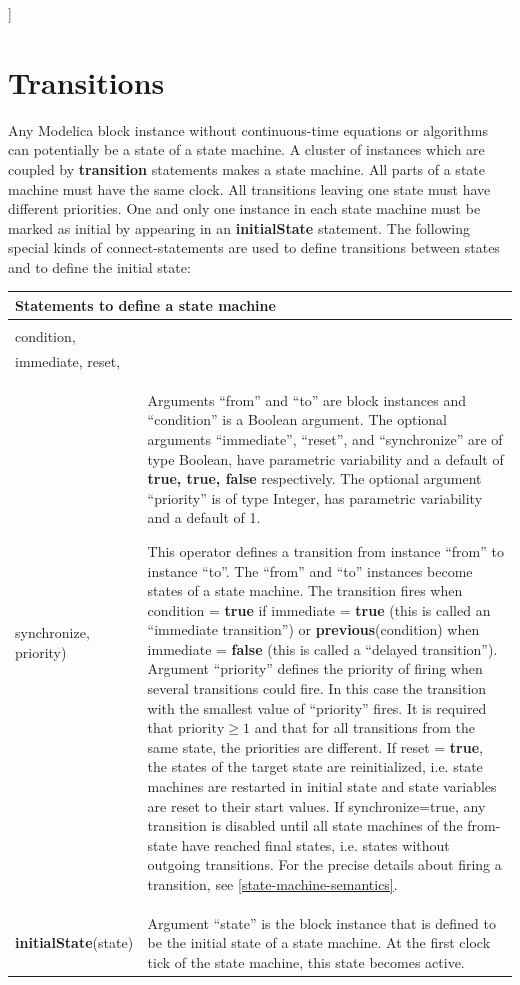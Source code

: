 \documentclass[10pt,a4paper]{report}
\def\doublelabel#1{\label{#1}}
\begin{document}
{]}

\section{Transitions}\doublelabel{transitions}

Any Modelica block instance without continuous-time equations or
algorithms can potentially be a state of a state machine. A cluster of
instances which are coupled by \textbf{transition} statements makes a
state machine. All parts of a state machine must have the same clock.
All transitions leaving one state must have different priorities. One
and only one instance in each state machine must be marked as initial by
appearing in an \textbf{initialState} statement. The following special
kinds of connect-statements are used to define transitions between
states and to define the initial state:

\begin{longtable}[]{|p{4cm}|p{10cm}|}
\hline \endhead
\multicolumn{2}{|p{12cm}|}{\textbf{Statements to define a state machine}}\\ \hline
\begin{tabular}{@{}p{4cm}@{}}
\textbf{transition}(from, to, \\ condition,\\
immediate, reset,\\
synchronize, priority)
\end{tabular}
&
Arguments ``from'' and ``to'' are block instances and ``condition'' is a
Boolean argument. The optional arguments ``immediate'', ``reset'', and
``synchronize'' are of type Boolean, have parametric variability and a
default of \textbf{true, true, false} respectively. The optional
argument ``priority'' is of type Integer, has parametric variability and
a default of 1.

This operator defines a transition from instance ``from'' to instance
``to''. The ``from'' and ``to'' instances become states of a state
machine. The transition fires when condition = \textbf{true} if
immediate = \textbf{true} (this is called an ``immediate transition'')
or \textbf{previous}(condition) when immediate = \textbf{false} (this is
called a ``delayed transition''). Argument ``priority'' defines the
priority of firing when several transitions could fire. In this case the
transition with the smallest value of ``priority'' fires. It is required
that $\textrm{priority}\ge 1$ and that for all transitions from the same state, the
priorities are different. If reset = \textbf{true}, the states of the
target state are reinitialized, i.e. state machines are restarted in
initial state and state variables are reset to their start values. If
synchronize=true, any transition is disabled until all state machines of
the from-state have reached final states, i.e. states without outgoing
transitions. For the precise details about firing a transition, see
\ref{state-machine-semantics}.\\ \hline
\textbf{initialState}(state) & Argument ``state'' is the block instance
that is defined to be the initial state of a state machine. At the first
clock tick of the state machine, this state becomes
active.\\ \hline
\end{longtable}
\end{document}
